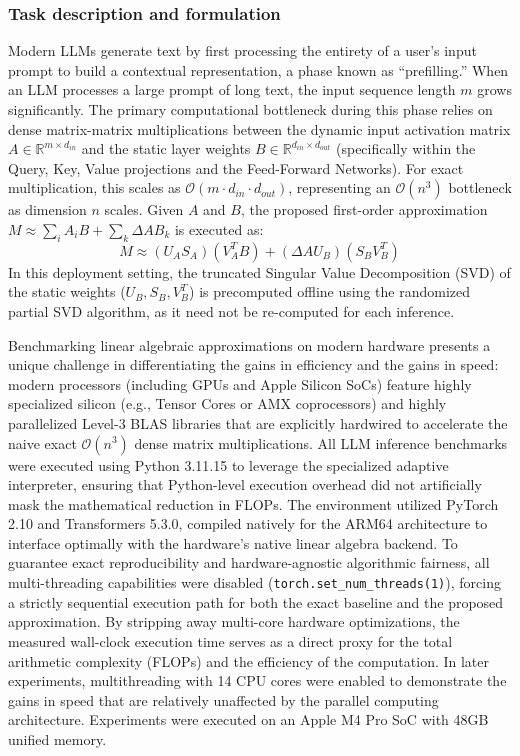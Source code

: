 \documentclass[onefignum,onetabnum]{siamart171218}
\newcommand{\R}{\mathbb{R}}
\begin{document}
\subsubsection{Task description and formulation}
Modern LLMs generate text by first processing the entirety of a user's input prompt to build a contextual representation, a phase known as ``prefilling.'' When an LLM processes a large prompt of long text, the input sequence length $m$ grows significantly. The primary computational bottleneck during this phase relies on dense matrix-matrix multiplications between the dynamic input activation matrix $A \in \R^{m \times d_{in}}$ and the static layer weights $B \in \R^{d_{in} \times d_{out}}$ (specifically within the Query, Key, Value projections and the Feed-Forward Networks). For exact multiplication, this scales as $\mathcal{O}(m \cdot d_{in} \cdot d_{out})$, representing an $\mathcal{O}(n^3)$ bottleneck as dimension $n$ scales. Given $A$ and $B$, the proposed first-order approximation $M \approx \sum_{i} A_i B + \sum_{k} \Delta A B_k$ is executed as:
$$M \approx (U_A S_A) (V_A^T B) + (\Delta A U_B) (S_B V_B^T)$$
In this deployment setting, the truncated Singular Value Decomposition (SVD) of the static weights ($U_B, S_B, V_B^T$) is precomputed offline using the randomized partial SVD algorithm, as it need not be re-computed for each inference\cite{Codes}. 

Benchmarking linear algebraic approximations on modern hardware presents a unique challenge in differentiating the gains in efficiency and the gains in speed: modern processors (including GPUs and Apple Silicon SoCs) feature highly specialized silicon (e.g., Tensor Cores or AMX coprocessors) and highly parallelized Level-3 BLAS libraries that are explicitly hardwired to accelerate the naive exact $\mathcal{O}(n^3)$ dense matrix multiplications. All LLM inference benchmarks were executed using Python 3.11.15 to leverage the specialized adaptive interpreter, ensuring that Python-level execution overhead did not artificially mask the mathematical reduction in FLOPs. The environment utilized PyTorch 2.10 and Transformers 5.3.0, compiled natively for the ARM64 architecture to interface optimally with the hardware's native linear algebra backend. To guarantee exact reproducibility and hardware-agnostic algorithmic fairness, all multi-threading capabilities were disabled (\texttt{torch.set\_num\_threads(1)}), forcing a strictly sequential execution path for both the exact baseline and the proposed approximation. By stripping away multi-core hardware optimizations, the measured wall-clock execution time serves as a direct proxy for the total arithmetic complexity (FLOPs) and the efficiency of the computation. In later experiments, multithreading with 14 CPU cores were enabled to demonstrate the gains in speed that are relatively unaffected by the parallel computing architecture. Experiments were executed on an Apple M4 Pro SoC with 48GB unified memory.
\end{document}
